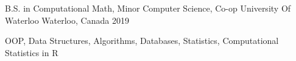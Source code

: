 \begin{cventries}
  \cventry
    {B.S. in Computational Math, Minor Computer Science, Co-op}
    {University Of Waterloo}
    {Waterloo, Canada}
    {2019}
    {
      \begin{cvitems}
        \item {OOP, Data Structures, Algorithms, Databases, Statistics, Computational Statistics in R}
      \end{cvitems}
    }
\end{cventries}
